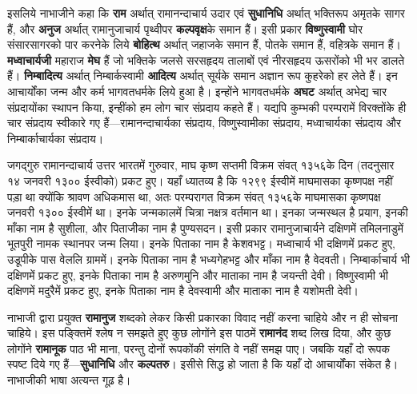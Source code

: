 \begin{sloppypar}\justifying{}
इसलिये नाभाजीने कहा कि \textbf{राम} अर्थात् रामानन्दाचार्य उदार एवं \textbf{सुधानिधि} अर्थात् भक्तिरूप अमृतके सागर हैं, और \textbf{अनुज} अर्थात् रामानुजाचार्य पृथ्वीपर \textbf{कल्पवृक्ष}के समान हैं। इसी प्रकार \textbf{विष्णुस्वामी} घोर संसार\-सागरको पार करनेके लिये \textbf{बोहित्थ} अर्थात् जहाजके समान हैं, पोतके समान हैं, वहित्रके समान हैं। \textbf{मध्वाचार्यजी} महाराज \textbf{मेघ} हैं जो भक्तिके जलसे सरसहृदय तालाबों एवं नीरसहृदय ऊसरोंको भी भर डालते हैं। \textbf{निम्बादित्य} अर्थात् निम्बार्कस्वामी \textbf{आदित्य} अर्थात् सूर्यके समान अज्ञान रूप कुहरेको हर लेते हैं। इन आचार्योंका जन्म और कर्म भागवत\-धर्मके लिये हुआ है। इन्होंने भागवत\-धर्मके \textbf{अघट} अर्थात् अभेद्य चार संप्रदायोंका स्थापन किया, इन्हींको हम लोग चार संप्रदाय कहते हैं। यद्यपि कुम्भकी परम्परामें विरक्तोंके ही चार संप्रदाय स्वीकारे गए हैं—रामानन्दाचार्यका संप्रदाय, विष्णुस्वामीका संप्रदाय, मध्वाचार्यका संप्रदाय और निम्बार्काचार्यका संप्रदाय।
\end{sloppypar}
\begin{sloppypar}\justifying{}
जगद्गुरु रामानन्दाचार्य उत्तर भारतमें गुरुवार, माघ कृष्ण सप्तमी विक्रम संवत् १३५६के दिन (तदनुसार १४ जनवरी १३०० ईस्वीको) प्रकट हुए। यहाँ ध्यातव्य है कि १२९९ ईस्वीमें माघमासका कृष्णपक्ष नहीं पड़ा था क्योंकि श्रावण अधिकमास था, अतः परम्परागत विक्रम संवत् १३५६के माघमासका कृष्णपक्ष जनवरी १३०० ईस्वीमें था। इनके जन्मकालमें चित्रा नक्षत्र वर्तमान था। इनका जन्मस्थल है प्रयाग, इनकी माँका नाम है सुशीला, और पिताजीका नाम है पुण्यसदन। इसी प्रकार रामानुजाचार्यने दक्षिणमें तमिलनाडुमें भूतपुरी नामक स्थानपर जन्म लिया। इनके पिताका नाम है केशवभट्ट। मध्वाचार्य भी दक्षिणमें प्रकट हुए, उडूपीके पास वेललि ग्राममें। इनके पिताका नाम है भध्यगेहभट्ट और माँका नाम है वेदवती। निम्बार्काचार्य भी दक्षिणमें प्रकट हुए, इनके पिताका नाम है अरुणमुनि और माताका नाम है जयन्ती देवी। विष्णुस्वामी भी दक्षिणमें मदुरैमें प्रकट हुए, इनके पिताका नाम है देवस्वामी और माताका नाम है यशोमती देवी।
\end{sloppypar}
\begin{sloppypar}\justifying{}
नाभाजी द्वारा प्रयुक्त \textbf{रामानुज} शब्दको लेकर किसी प्रकारका विवाद नहीं करना चाहिये और न ही सोचना चाहिये। इस पङ्क्तिमें श्लेष न समझते हुए कुछ लोगोंने इस पाठमें \textbf{रामानंद} शब्द लिख दिया, और कुछ लोगोंने \textbf{रामानूक} पाठ भी माना, परन्तु दोनों रूपकोंकी संगति वे नहीं समझ पाए। जबकि यहाँ दो रूपक स्पष्ट दिये गए हैं—\textbf{सुधानिधि} और \textbf{कल्पतरु}। इसीसे सिद्ध हो जाता है कि यहाँ दो आचार्योंका संकेत है। नाभाजीकी भाषा अत्यन्त गूढ़ है।
\end{sloppypar}

